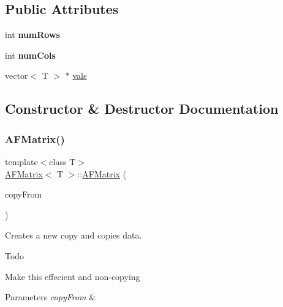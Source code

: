\subsection*{Public Attributes}
\begin{DoxyCompactItemize}
\item 
\mbox{\label{classAFMatrix_aa9abc20d5ac9a0966ba87163ead53fc3}} 
int {\bfseries num\+Rows}
\item 
\mbox{\label{classAFMatrix_a393ec805206c6c43e5b949b71c115244}} 
int {\bfseries num\+Cols}
\item 
vector$<$ T $>$ $\ast$ \hyperlink{classAFMatrix_a124e51921d4275e00354d3af98399d1e}{vals}
\end{DoxyCompactItemize}


\subsection{Constructor \& Destructor Documentation}
\mbox{\label{classAFMatrix_a918b5f7c03cb3a305ec94e08afd3e09a}} 
\subsubsection{\texorpdfstring{A\+F\+Matrix()}{AFMatrix()}\hspace{0.1cm}{\footnotesize\ttfamily [1/2]}}
{\footnotesize\ttfamily template$<$class T$>$ \\
\hyperlink{classAFMatrix}{A\+F\+Matrix}$<$ T $>$\+::\hyperlink{classAFMatrix}{A\+F\+Matrix} (\begin{DoxyParamCaption}\item[{\hyperlink{classAFMatrix}{A\+F\+Matrix}$<$ T $>$ $\ast$}]{copy\+From }\end{DoxyParamCaption})\hspace{0.3cm}{\ttfamily [inline]}}

Creates a new copy and copies data. \begin{DoxyRefDesc}{Todo}
\item[\hyperlink{todo__todo000002}{Todo}]Make this effecient and non-\/copying \end{DoxyRefDesc}

\begin{DoxyParams}{Parameters}
{\em copy\+From} & \\
\hline
\end{DoxyParams}
\mbox{\label{classAFMatrix_a0dfd54218d171d086a738a0525c5946e}} 

